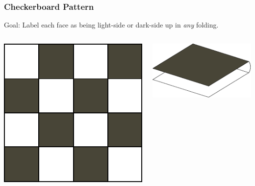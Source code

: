 \documentclass{beamer}
\begin{document}
\begin{frame}
\frametitle{Checkerboard Pattern}

\begin{block}{Goal:}
Label each face as being light-side or dark-side up in \textit{any} folding.
\end{block}

\bigskip

\begin{columns}[c]
\includegraphics[width=\textwidth]{sam_images/checkerboard-complete.pdf}


\includegraphics[width=.9\textwidth]{sam_images/checkerboard-3a.pdf}


\end{columns}
\end{frame}
\end{document}
